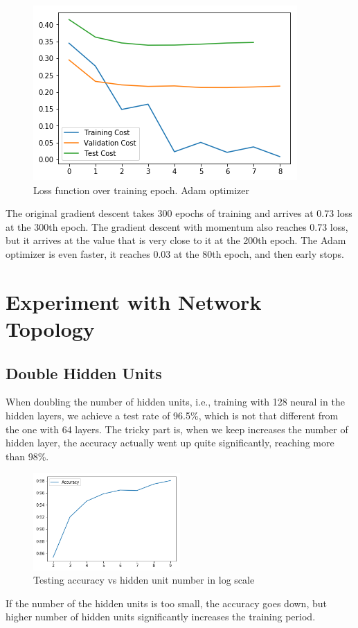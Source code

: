 \documentclass{article}
\begin{document}
\begin{figure}[h]
\begin{minipage}{0.3\textwidth}
	\end{minipage}\hfill
	\begin{minipage}{0.3\textwidth}
	\centering
	\includegraphics[width=\textwidth]{pics/loss_adam.png}
	\caption{Loss function over training epoch. Adam optimizer}
	\end{minipage}
\end{figure}

The original gradient descent takes 300 epochs of training and arrives at 0.73 loss at the 300th epoch. The gradient descent with momentum also reaches 0.73 loss, but it arrives at the value that is very close to it at the 200th epoch. The Adam optimizer is even faster, it reaches 0.03 at the 80th epoch, and then early stops.


\newpage
\section{Experiment with Network Topology}
\subsection{Double Hidden Units}
When doubling the number of hidden units, i.e., training with 128 neural in the hidden layers, we achieve a test rate of 96.5\%, which is not that different from the one with 64 layers. The tricky part is, when we keep increases the number of hidden layer, the accuracy actually went up quite significantly, reaching more than 98\%.
\begin{figure}[h]
\centering
\includegraphics[width=0.5\textwidth]{pics/acc_hidden.png}
\caption{Testing accuracy vs hidden unit number in log scale}
\end{figure}
If the number of the hidden units is too small, the accuracy goes down, but higher number of hidden units significantly increases the training period.
\end{document}
